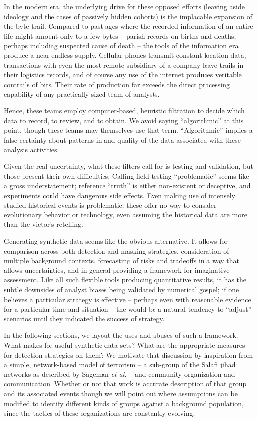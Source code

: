 \documentclass{article}
\newcommand{\todoCP}[1]{\todo{CP, #1}}
\begin{document}
In the modern era, the underlying drive for these opposed efforts (leaving aside ideology and the cases of passively hidden cohorts) is the implacable expansion of the byte trail.  Compared to past ages where the recorded information of an entire life might amount only to a few bytes -- parish records on births and deaths, perhaps including suspected cause of death -- the tools of the information era produce a near endless supply.  Cellular phones transmit constant location data, transactions with even the most remote subsidiary of a company leave trails in their logistics records, and of course any use of the internet produces veritable contrails of bits.  Their rate of production far exceeds the direct processing capability of any practically-sized team of analysts.

Hence, these teams employ computer-based, heuristic filtration to decide which data to record, to review, and to obtain.  We avoid saying ``algorithmic'' at this point, though these teams may themselves use that term.  ``Algorithmic'' implies a false certainty about patterns in and quality of the data associated with these analysis activities.

Given the real uncertainty, what these filters call for is testing and validation, but those present their own difficulties.  Calling field testing ``problematic'' seems like a gross understatement; reference ``truth'' is either non-existent or deceptive, and experiments could have dangerous side effects.  Even making use of intensely studied historical events is problematic: these offer no way to consider evolutionary behavior or technology, even assuming the historical data are more than the victor's retelling.

Generating synthetic data seems like the obvious alternative.  It allows for comparison across both detection and masking strategies, consideration of multiple background contexts, forecasting of risks and tradeoffs in a way that allows uncertainties, and in general providing a framework for imaginative assessment.  Like all such flexible tools producing quantitative results, it has the subtle downsides of analyst biases being validated by numerical gospel; if one believes a particular strategy is effective -- perhaps even with reasonable evidence for a particular time and situation -- the would be a natural tendency to ``adjust'' scenarios until they indicated the success of strategy.

In the following sections, we layout the uses and abuses of such a framework.  What makes for useful synthetic data sets? What are the appropriate measures for detection strategies on them?  We motivate that discussion by inspiration from a simple, network-based model of terrorism -- a sub-group of the Salafi jihad networks as described by Sageman {\em et al.}\cite{sageman} -- and community organization and communication.  Whether or not that work is accurate description of that group and its associated events\todoCP{connective tissue missing here.} though we will point out where assumptions can be modified to identify different kinds of groups against a background population, since the tactics of these organizations are constantly evolving. 
\end{document}
